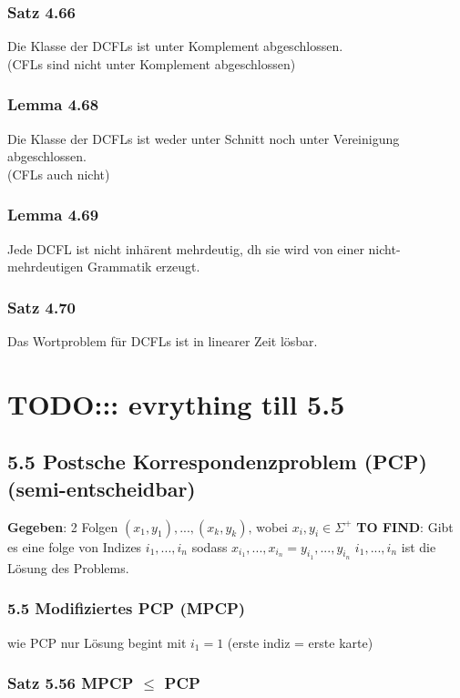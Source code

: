 \documentclass[11pt]{article}
\begin{document}
\subsubsection{Satz 4.66}
\label{sec:orgc086143}
Die Klasse der DCFLs ist unter Komplement abgeschlossen. \\
(CFLs sind nicht unter Komplement abgeschlossen)
\subsubsection{Lemma 4.68}
\label{sec:org2306d56}
Die Klasse der DCFLs ist weder unter Schnitt noch unter
Vereinigung abgeschlossen. \\
(CFLs auch nicht)
\subsubsection{Lemma 4.69}
\label{sec:org1f97f58}
Jede DCFL ist nicht inhärent mehrdeutig, dh sie wird von einer
nicht-mehrdeutigen Grammatik erzeugt.
\subsubsection{Satz 4.70}
\label{sec:org09dafbf}
Das Wortproblem für DCFLs ist in linearer Zeit lösbar.



\section{TODO::: evrything till 5.5}
\label{sec:orgbe180e2}


\subsection{5.5 Postsche Korrespondenzproblem (PCP) (semi-entscheidbar)}
\label{sec:org33c6b14}
\textbf{Gegeben}: 2 Folgen \((x_1, y_1), ..., (x_k, y_k)\text{, wobei } x_i, y_i \in \Sigma^+\)
\textbf{TO FIND}: Gibt es eine folge von Indizes \(i_1, ..., i_n\) sodass \(x_{i_1}, ..., x_{i_n} = y_{i_1}, ..., y_{i_n}\)
\(i_1, ..., i_n\) ist die Lösung des Problems.

\subsubsection{5.5 Modifiziertes PCP (MPCP)}
\label{sec:org64b5349}
wie PCP nur Lösung begint mit \(i_1 = 1\) (erste indiz = erste karte)

\subsubsection{Satz 5.56 MPCP \(\leq\) PCP}
\label{sec:org6827e78}
\end{document}
